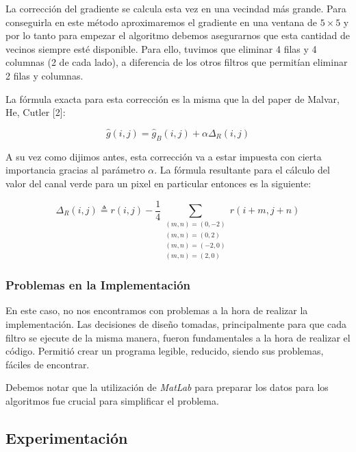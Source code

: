 La corrección del gradiente se calcula esta vez en una vecindad más grande. Para conseguirla en este método aproximaremos el gradiente en una ventana de $5 \times 5$  y por lo tanto para empezar el algoritmo debemos asegurarnos que esta cantidad de vecinos siempre esté disponible. Para ello, tuvimos que eliminar 4 filas y 4 columnas (2 de cada lado), a diferencia de los otros filtros que permitían eliminar 2 filas y columnas.

\vspace{\baselineskip}

La fórmula exacta para esta corrección es la misma que la del paper de Malvar, He, Cutler [2]: 

\[ \hat{g}(i,j) = \hat{g}_B(i,j) + \alpha\Delta_R(i,j) \]

\vspace{\baselineskip}

A su vez como dijimos antes, esta corrección va a estar impuesta con cierta importancia gracias al parámetro $\alpha$. La fórmula resultante para el cálculo del valor del canal verde para un pixel en particular entonces es la siguiente:

\[ \Delta_R(i,j) \triangleq r(i,j) - \dfrac{1}{4} \sum_{\substack{
(m,n) = (0,-2) \\
(m,n) = (0,2) \\
(m,n) = (-2,0) \\
(m,n) =  (2,0)
  }} r(i+m, j+n) \]


\subsubsection{Problemas en la Implementación}
En este caso, no nos encontramos con problemas a la hora de realizar la implementación. Las decisiones de diseño tomadas, principalmente para que cada filtro se ejecute de la misma manera, fueron fundamentales a la hora de realizar el código. Permitió crear un programa legible, reducido, siendo sus problemas, fáciles de encontrar.

\vspace{\baselineskip}

Debemos notar que la utilización de \textit{MatLab} para preparar los datos para los algoritmos fue crucial para simplificar el problema.
	
\newpage
\subsection{Experimentación}

